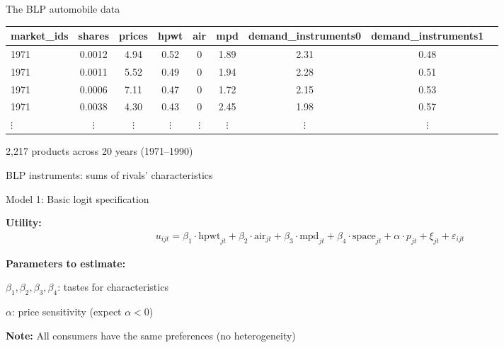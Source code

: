 \documentclass[notes,11pt, aspectratio=169]{beamer}
\newenvironment{wideitemize}{\itemize\addtolength{\itemsep}{10pt}}{\enditemize}
\begin{document}
\begin{frame}{The BLP automobile data}
	\begin{center}
		\tiny
		\begin{tabular}{lcccccccc}
			\toprule
			\textbf{market\_ids} & \textbf{shares} & \textbf{prices} & \textbf{hpwt} & \textbf{air} & \textbf{mpd} & \textbf{demand\_instruments0} & \textbf{demand\_instruments1} \\
			\midrule
			1971 & 0.0012 & 4.94 & 0.52 & 0 & 1.89 & 2.31 & 0.48 \\
			1971 & 0.0011 & 5.52 & 0.49 & 0 & 1.94 & 2.28 & 0.51 \\
			1971 & 0.0006 & 7.11 & 0.47 & 0 & 1.72 & 2.15 & 0.53 \\
			1971 & 0.0038 & 4.30 & 0.43 & 0 & 2.45 & 1.98 & 0.57 \\
			$\vdots$ & $\vdots$ & $\vdots$ & $\vdots$ & $\vdots$ & $\vdots$ & $\vdots$ & $\vdots$ \\
			\bottomrule
		\end{tabular}
	\end{center}
	\vspace{5pt}
	\begin{wideitemize}
		\item 2,217 products across 20 years (1971--1990)
		\item BLP instruments: sums of rivals' characteristics
	\end{wideitemize}
\end{frame}

\begin{frame}{Model 1: Basic logit specification}
	\begin{wideitemize}
		\item \textbf{Utility:}
		\begin{align*}
			u_{ijt} = \beta_1 \cdot \text{hpwt}_{jt} + \beta_2 \cdot \text{air}_{jt} + \beta_3 \cdot \text{mpd}_{jt} + \beta_4 \cdot \text{space}_{jt} + \alpha \cdot p_{jt} + \xi_{jt} + \varepsilon_{ijt}
		\end{align*}
		\item \textbf{Parameters to estimate:}
		\begin{wideitemize}
			\item $\beta_1, \beta_2, \beta_3, \beta_4$: tastes for characteristics
			\item $\alpha$: price sensitivity (expect $\alpha < 0$)
		\end{wideitemize}
		\item \textbf{Note:} All consumers have the same preferences (no heterogeneity)
	\end{wideitemize}
\end{frame}
\end{document}
